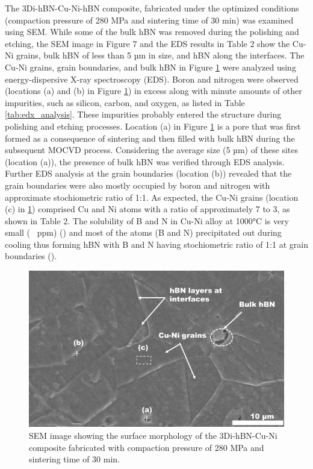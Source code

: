 The 3Di-hBN-Cu-Ni-hBN composite, fabricated under the optimized conditions (compaction pressure of 280 MPa and sintering time of 30 min) was examined using SEM. While some of the bulk hBN was removed during the polishing and etching, the SEM image in Figure 7 and the EDS results in Table 2 show the Cu-Ni grains, bulk hBN of less than 5 µm in size, and hBN along the interfaces. The Cu-Ni grains, grain boundaries, and bulk hBN in Figure \ref{fig:EM-EDX} were analyzed using energy-dispersive X-ray spectroscopy (EDS). Boron and nitrogen were observed (locations (a) and (b) in Figure \ref{fig:EM-EDX}) in excess along with minute amounts of other impurities, such as silicon, carbon, and oxygen, as listed in Table \ref{tab:edx_analysis}. These impurities probably entered the structure during polishing and etching processes. Location (a) in Figure \ref{fig:EM-EDX} is a pore that was first formed as a consequence of sintering and then filled with bulk hBN during the subsequent MOCVD process. Considering the average size (5 µm) of these sites (location (a)), the presence of bulk hBN was verified through EDS analysis. Further EDS analysis at the grain boundaries (location (b)) revealed that the grain boundaries were also mostly occupied by boron and nitrogen with approximate stochiometric ratio of 1:1. As expected, the Cu-Ni grains (location (c) in \ref{fig:EM-EDX}) comprised Cu and Ni atoms with a ratio of approximately 7 to 3, as shown in Table 2. The solubility of B and N in Cu-Ni alloy at 1000°C is very small (~ ppm) (\cite{el2018microstructure}) and most of the atoms (B and N) precipitated out during cooling thus forming hBN with B and N having stochiometric ratio of 1:1 at grain boundaries (\cite{khan20172d, koepke2016role}).

\begin{figure}[!htb]
\centering
\includegraphics [scale=1.0]{graphics/chapter_2/SEM-EDX}
\caption{SEM image showing the surface morphology of the 3Di-hBN-Cu-Ni composite fabricated with compaction pressure of 280 MPa and sintering time of 30 min.}
\label{fig:EM-EDX}
\end{figure}

